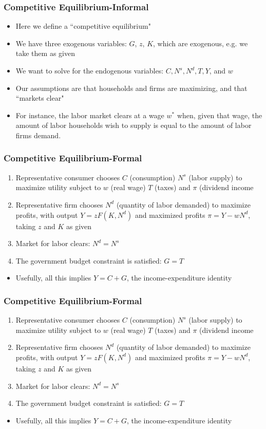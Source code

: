 \documentclass{beamer}
\begin{document}
\begin{frame}
\frametitle[alignment=center]{Competitive Equilibrium-Informal}
\begin{itemize}
\item Here we define a ``competitive equilibrium"
\bigskip
\item We have three exogenous variables:  $G$, $z$, $K$, which are exogenous, e.g. we take them as given
\bigskip
\item We want to solve for the endogenous variables: $C,N^s,N^d,T,Y$, and $w$
\bigskip
\item Our assumptions are that households and firms are maximizing, and that ``markets clear"
\bigskip
\item For instance, the labor market clears at a wage $w^*$ when, given that wage, the amount of labor households wish to supply is equal to the amount of labor firms demand.  
\end{itemize}
\end{frame}

\begin{frame}
\frametitle[alignment=center]{Competitive Equilibrium-Formal}
\begin{enumerate}
\item Representative consumer chooses $C$ (consumption) $N^s$ (labor supply) to maximize utility subject to $w$ (real wage) $T$ (taxes) and $\pi$ (dividend income
\item Representative firm chooses $N^d$ (quantity of labor demanded) to maximize profits, with output $Y=zF(K,N^d)$ and maximized profits $\pi=Y-wN^d$, taking $z$ and $K$ as given
\item Market for labor clears:  $N^d=N^s$
\item The government budget constraint is satisfied:  $G=T$
\end{enumerate}
\begin{itemize}
\item Usefully, all this implies $Y=C+G$, the income-expenditure identity
\end{itemize}
\end{frame}

\begin{frame}
\frametitle[alignment=center]{Competitive Equilibrium-Formal}
\begin{enumerate}
\item Representative consumer chooses $C$ (consumption) $N^s$ (labor supply) to maximize utility subject to $w$ (real wage) $T$ (taxes) and $\pi$ (dividend income
\item Representative firm chooses $N^d$ (quantity of labor demanded) to maximize profits, with output $Y=zF(K,N^d)$ and maximized profits $\pi=Y-wN^d$, taking $z$ and $K$ as given
\item Market for labor clears:  $N^d=N^s$
\item The government budget constraint is satisfied:  $G=T$
\end{enumerate}
\begin{itemize}
\item Usefully, all this implies $Y=C+G$, the income-expenditure identity
\end{itemize}
\end{frame}
\end{document}
